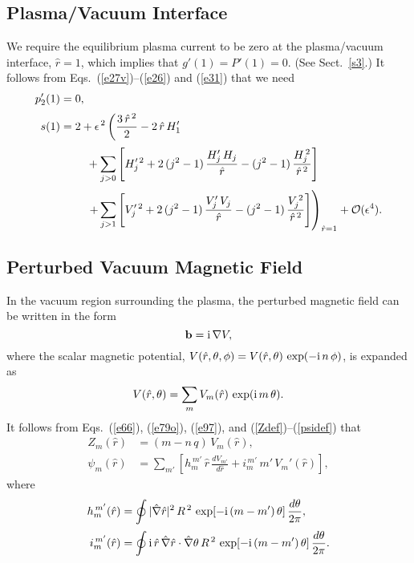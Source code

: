 \documentclass[12pt,prb,aps]{revtex4-1}
\begin{document}
\subsection{Plasma/Vacuum Interface}
We require the equilibrium plasma current to be zero at the plasma/vacuum interface, $\hat{r}=1$, which
implies that $g'(1)=P'(1)= 0$. (See Sect.~\ref{s3}.) It follows from Eqs.~(\ref{e27v})--(\ref{e26}) and (\ref{e31}) that we need\,\cite{am1}
\begin{align}
p_2'(1) &= 0,\label{e222}\\[0.5ex]
s(1) &= 2+ \epsilon^{\,2}\left(\frac{3\,\hat{r}^{\,2}}{2}-2\,\hat{r}\,H_1'\right.\nonumber\\[0.5ex]
&\phantom{===}
+\sum_{j>0}\left[H_j'^{\,2}+2\,(j^2-1)\,\frac{H_j'\,H_j}{\hat{r}}-(j^2-1)\,\frac{H_j^{\,2}}{\hat{r}^{\,2}}\right]\nonumber\\[0.5ex]
&\phantom{===}\left.+\sum_{j>1}\left[V_j'^{\,2}+2\,(j^2-1)\,\frac{V_j'\,V_j}{\hat{r}}-(j^2-1)\,\frac{V_j^{\,2}}{\hat{r}^{\,2}}\right]\right)_{\hat{r}=1}
+{\cal O}(\epsilon^4).\label{e223}
\end{align}

\subsection{Perturbed Vacuum Magnetic Field}
In the vacuum region surrounding the plasma, the perturbed magnetic field can be written in the form\,\cite{am1}
\begin{equation}
{\bf b} = {\rm i}\,\nabla V,
\end{equation}
where the scalar magnetic potential, $V(\hat{r},\theta,\phi)= V(\hat{r},\theta)\,\exp(-{\rm i}\,n\,\phi)$,  is expanded as 
\begin{equation}\label{e225}
V(\hat{r},\theta) = \sum_{m}V_m(\hat{r})\,\exp({\rm i}\,m\,\theta).
\end{equation}
It follows from Eqs.~(\ref{e66}), (\ref{e79o}), (\ref{e97}), and (\ref{Zdef})--(\ref{psidef}) that
\begin{align}
Z_m(\hat{r})&= (m-n\,q)\,V_m(\hat{r}),\label{evdef}\\[0.5ex]
\psi_m(\hat{r}) &= \sum_{m'}\left[h_m^{\,m'}\,\hat{r}\,\frac{dV_{m'}}{d\hat{r}}+ i_{m}^{\,m'}\,m'\,V_m'(\hat{r})\right],
\end{align}
where
\begin{align}
h_m^{\,m'}(\hat{r})&= \oint |\hat{\nabla}\hat{r}|^2\,R^{\,2}\,\exp[-{\rm i}\,(m-m')\,\theta]\,\frac{d\theta}{2\pi},\\[0.5ex]
i_m^{\,m'}(\hat{r})&= \oint {\rm i}\,\hat{r}\,\hat{\nabla} \hat{r}\cdot\hat{\nabla}\theta\,R^{\,2} \,\exp[-{\rm i}\,(m-m')\,\theta]\,\frac{d\theta}{2\pi}.\label{e229}
\end{align}
\end{document}
